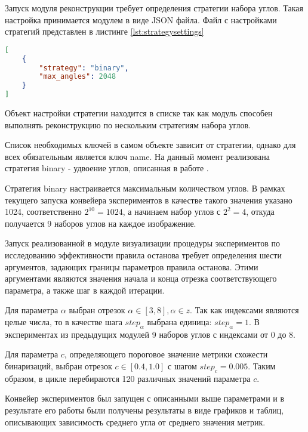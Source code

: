 Запуск модуля реконструкции требует определения стратегии набора углов. Такая настройка принимается модулем в виде JSON файла. Файл с настройками стратегий представлен в листинге \ref*{lst:strategysettings}

\begin{lstlisting}[language=json, caption={Файл конфигурации стратегий набора углов для конвейера экспериментов}, label={lst:strategysettings}]
[
    {
        "strategy": "binary",
        "max_angles": 2048
    }
]
\end{lstlisting}

Объект настройки стратегии находится в списке так как модуль способен выполнять реконструкцию по нескольким стратегиям набора углов.

Список необходимых ключей в самом объекте зависит от стратегии, однако для всех обязательным является ключ name. На данный момент реализована стратегия binary - удвоение углов, описанная в работе \cite{gilmanov2024applicability}.

Стратегия binary настраивается максимальным количеством углов. В рамках текущего запуска конвейера экспериментов в качестве такого значения указано 1024, соответственно \(2^{10} = 1024\), а начинаем набор углов с \(2^2 = 4\), откуда получается 9 наборов углов на каждое изображение.

Запуск реализованной в модуле визуализации процедуры экспериментов по исследованию эффективности правила останова требует определения шести аргументов, задающих границы параметров правила останова. Этими аргументами являются значения начала и конца отрезка соответствующего параметра, а также шаг в каждой итерации.

Для параметра \(\alpha\) выбран отрезок \(\alpha \in [3, 8], \alpha \in z\). Так как индексами являются целые числа, то в качестве шага \(step_{\alpha}\) выбрана единица: \(step_{\alpha} = 1\). В экспериментах из предыдущих модулей 9 наборов углов с индексами от 0 до 8.

Для параметра \(c\), определяющего пороговое значение метрики схожести бинаризаций, выбран отрезок \(c \in [0.4, 1.0]\) с шагом \(step_c = 0.005\). Таким образом, в цикле перебираются 120 различных значений параметра \(c\).

Конвейер экспериментов был запущен с описанными выше параметрами и в результате его работы были получены результаты в виде графиков и таблиц, описывающих зависимость среднего угла от среднего значения метрик. 




